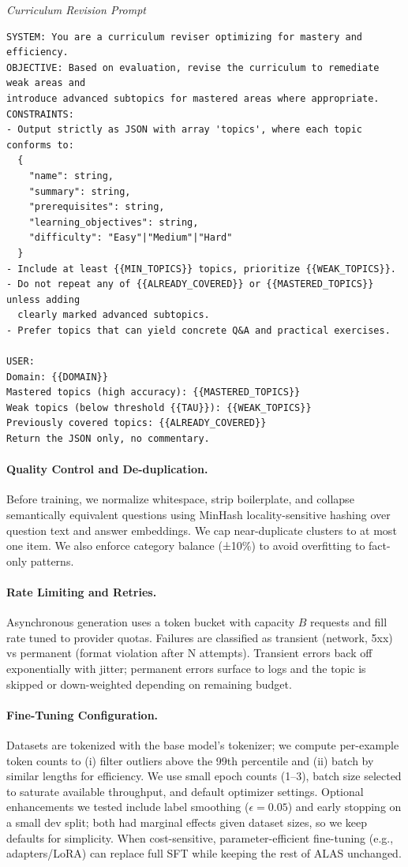\documentclass[11pt]{article}
\begin{document}
\emph{Curriculum Revision Prompt}
\begin{verbatim}
SYSTEM: You are a curriculum reviser optimizing for mastery and efficiency.
OBJECTIVE: Based on evaluation, revise the curriculum to remediate weak areas and
introduce advanced subtopics for mastered areas where appropriate.
CONSTRAINTS:
- Output strictly as JSON with array 'topics', where each topic conforms to:
  {
    "name": string,
    "summary": string,
    "prerequisites": string,
    "learning_objectives": string,
    "difficulty": "Easy"|"Medium"|"Hard"
  }
- Include at least {{MIN_TOPICS}} topics, prioritize {{WEAK_TOPICS}}.
- Do not repeat any of {{ALREADY_COVERED}} or {{MASTERED_TOPICS}} unless adding
  clearly marked advanced subtopics.
- Prefer topics that can yield concrete Q&A and practical exercises.

USER:
Domain: {{DOMAIN}}
Mastered topics (high accuracy): {{MASTERED_TOPICS}}
Weak topics (below threshold {{TAU}}): {{WEAK_TOPICS}}
Previously covered topics: {{ALREADY_COVERED}}
Return the JSON only, no commentary.
\end{verbatim}

\paragraph{Quality Control and De-duplication.} Before training, we normalize whitespace, strip boilerplate, and collapse semantically equivalent questions using MinHash locality-sensitive hashing over question text and answer embeddings. We cap near-duplicate clusters to at most one item. We also enforce category balance (±10\%) to avoid overfitting to fact-only patterns.

\paragraph{Rate Limiting and Retries.} Asynchronous generation uses a token bucket with capacity \(B\) requests and fill rate tuned to provider quotas. Failures are classified as transient (network, 5xx) vs permanent (format violation after N attempts). Transient errors back off exponentially with jitter; permanent errors surface to logs and the topic is skipped or down-weighted depending on remaining budget.

\paragraph{Fine-Tuning Configuration.} Datasets are tokenized with the base model's tokenizer; we compute per-example token counts to (i) filter outliers above the 99th percentile and (ii) batch by similar lengths for efficiency. We use small epoch counts (1--3), batch size selected to saturate available throughput, and default optimizer settings. Optional enhancements we tested include label smoothing (\(\epsilon=0.05\)) and early stopping on a small dev split; both had marginal effects given dataset sizes, so we keep defaults for simplicity. When cost-sensitive, parameter-efficient fine-tuning (e.g., adapters/LoRA) can replace full SFT while keeping the rest of ALAS unchanged.
\end{document}
